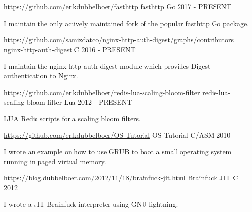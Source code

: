 \begin{cventries}
  \cventry
    {\href{https://github.com/erikdubbelboer/fasthttp}{\textcolor{link}{https://github.com/erikdubbelboer/fasthttp}}} %
    {fasthttp} %
    {Go} %
    {2017 - PRESENT} %
    {
      \begin{cvitems} %
				\item{I maintain the only actively maintained fork of the popular fasthttp Go package.}
      \end{cvitems}
    }

  \cventry
    {\href{https://github.com/samizdatco/nginx-http-auth-digest/graphs/contributors}{\textcolor{link}{https://github.com/samizdatco/nginx-http-auth-digest/graphs/contributors}}} %
    {nginx-http-auth-digest} %
    {C} %
    {2016 - PRESENT} %
    {
      \begin{cvitems} %
				\item{I maintain the nginx-http-auth-digest module which provides Digest authentication to Nginx.}
      \end{cvitems}
    }

  \cventry
		{\href{https://github.com/erikdubbelboer/redis-lua-scaling-bloom-filter}{\textcolor{link}{https://github.com/erikdubbelboer/redis-lua-scaling-bloom-filter}}}
    {redis-lua-scaling-bloom-filter} %
    {Lua} %
    {2012 - PRESENT} %
    {
      \begin{cvitems} %
				\item{LUA Redis scripts for a scaling bloom filters.}
      \end{cvitems}
    }

  \cventry
		{\href{https://github.com/erikdubbelboer/OS-Tutorial}{\textcolor{link}{https://github.com/erikdubbelboer/OS-Tutorial}}}
    {OS Tutorial} %
    {C/ASM} %
    {2010} %
    {
      \begin{cvitems} %
				\item{I wrote an example on how to use GRUB to boot a small operating system running in paged virtual memory.}
      \end{cvitems}
    }

  \cventry
		{\href{https://blog.dubbelboer.com/2012/11/18/brainfuck-jit.html}{\textcolor{link}{https://blog.dubbelboer.com/2012/11/18/brainfuck-jit.html}}}
    {Brainfuck JIT} %
    {C} %
    {2012} %
    {
      \begin{cvitems} %
			\item{I wrote a JIT Brainfuck interpreter using GNU lightning.}
      \end{cvitems}
    }


\end{cventries}
